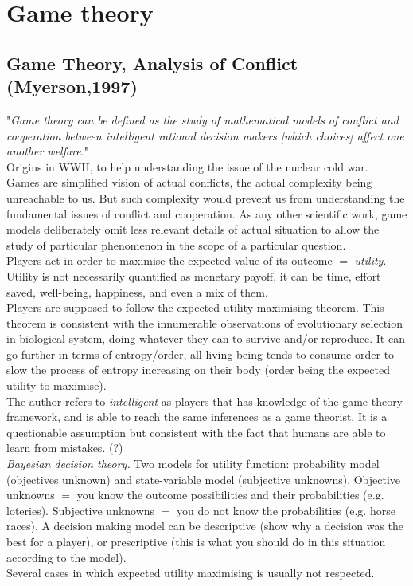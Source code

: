 \documentclass[12pt]{article}
\begin{document}
\section{Game theory}

\subsection{Game Theory, Analysis of Conflict (Myerson,1997)}

"\textit{Game theory can be defined as the study of mathematical models of conflict and cooperation between intelligent rational decision makers [which choices] affect one another welfare}."\\
Origins in WWII, to help understanding the issue of the nuclear cold war.\\
Games are simplified vision of actual conflicts, the actual complexity being unreachable to us. But such complexity would prevent us from understanding the fundamental issues of conflict and cooperation. As any other scientific work, game models deliberately omit less relevant details of actual situation to allow the study of particular phenomenon in the scope of a particular question.\\
Players act in order to maximise the expected value of its outcome $=$ \textit{utility}. Utility is not necessarily quantified as monetary payoff, it can be time, effort saved, well-being, happiness, and even a mix of them.\\
Players are supposed to follow the expected utility maximising theorem. This theorem is consistent with the innumerable observations of evolutionary selection in biological system, doing whatever they can to survive and/or reproduce. It can go further in terms of entropy/order, all living being tends to consume order to slow the process of entropy increasing on their body (order being the expected utility to maximise).\\
The author refers to \textit{intelligent} as players that has knowledge of the game theory framework, and is able to reach the same inferences as a game theorist. It is a questionable assumption but consistent with the fact that humans are able to learn from mistakes. (?)\\
\textit{Bayesian decision theory.} Two models for utility function: probability model (objectives unknown) and state-variable model (subjective unknowns). Objective unknowns $=$ you know the outcome possibilities and their probabilities (e.g. loteries). Subjective unknowns $=$ you do not know the probabilities (e.g. horse races).
A decision making model can be descriptive (show why a decision was the best for a player), or prescriptive (this is what you should do in this situation according to the model).\\
Several cases in which expected utility maximising is usually not respected.
\end{document}
